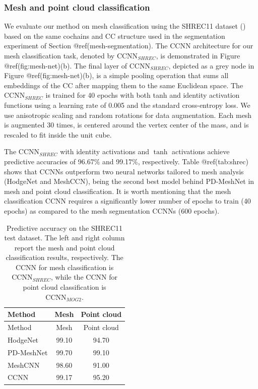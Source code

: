 \documentclass[
  12pt,
]{krantz}
\begin{document}
\subsubsection{Mesh and point cloud
classification}\label{mesh-and-point-cloud-classification}

We evaluate our method on mesh classification using the SHREC11 dataset
() based on the same
cochains and CC structure used in the segmentation experiment of Section
@ref(mesh-segmentation). The CCNN architecture for our mesh
classification task, denoted by \(\mbox{CCNN}_{SHREC}\), is demonstrated
in Figure @ref(fig:mesh-net)(b). The final layer of
\(\mbox{CCNN}_{SHREC}\), depicted as a grey node in Figure
@ref(fig:mesh-net)(b), is a simple pooling operation that sums all
embeddings of the CC after mapping them to the same Euclidean space. The
\(\mbox{CCNN}_{SHREC}\) is trained for 40 epochs with both tanh and
identity activation functions using a learning rate of 0.005 and the
standard cross-entropy loss. We use anisotropic scaling and random
rotations for data augmentation. Each mesh is augmented 30 times, is
centered around the vertex center of the mass, and is rescaled to fit
inside the unit cube.

The \(\mbox{CCNN}_{SHREC}\) with identity activations and \(\tanh\)
activations achieve predictive accuracies of 96.67\% and 99.17\%,
respectively. Table @ref(tab:shrec) shows that CCNNs outperform two
neural networks tailored to mesh analysis (HodgeNet and MeshCCN), being
the second best model behind PD-MeshNet in mesh and point cloud
classification. It is worth mentioning that the mesh classification CCNN
requires a significantly lower number of epochs to train (40 epochs) as
compared to the mesh segmentation CCNNs (600 epochs).

\begin{longtable}[]{@{}lcc@{}}
\caption{Predictive accuracy on the SHREC11 test dataset. The left and
right column report the mesh and point cloud classification results,
respectively. The CCNN for mesh classification is
\(\mbox{CCNN}_{SHREC}\), while the CCNN for point cloud classification
is \(\mbox{CCNN}_{MOG2}\).}\tabularnewline
\toprule\noalign{}
Method & Mesh & Point cloud \\
\midrule\noalign{}
\endfirsthead
\toprule\noalign{}
Method & Mesh & Point cloud \\
\midrule\noalign{}
\endhead
\bottomrule\noalign{}
\endlastfoot
HodgeNet & 99.10 & 94.70 \\
PD-MeshNet & 99.70 & 99.10 \\
MeshCNN & 98.60 & 91.00 \\
CCNN & 99.17 & 95.20 \\
\end{longtable}
\end{document}
